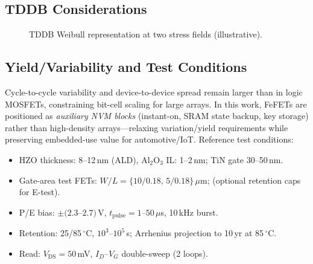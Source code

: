 \documentclass[journal]{IEEEtran}
\begin{document}
\subsection*{TDDB Considerations}
\begin{figure}[t]
\centering
{}
\caption{TDDB Weibull representation at two stress fields (illustrative).}
\label{fig:tddb}
\end{figure}

\subsection*{Yield/Variability and Test Conditions}
Cycle-to-cycle variability and device-to-device spread remain larger than in logic MOSFETs, constraining bit-cell scaling for large arrays. In this work, FeFETs are positioned as \emph{auxiliary NVM blocks} (instant-on, SRAM state backup, key storage) rather than high-density arrays—relaxing variation/yield requirements while preserving embedded-use value for automotive/IoT. Reference test conditions:
\begin{itemize}
  \item HZO thickness: 8–12\,nm (ALD), Al$_2$O$_3$ IL: 1–2\,nm; TiN gate 30–50\,nm.
  \item Gate-area test FETs: $W/L=\{10/0.18,\,5/0.18\}\,\mu$m; (optional retention caps for E-test).
  \item P/E bias: $\pm(2.3$–$2.7)$\,V, $t_\mathrm{pulse}=1$–$50\,\mu$s, 10\,kHz burst.
  \item Retention: 25/85\,$^\circ$C, $10^3$–$10^5$\,s; Arrhenius projection to 10\,yr at 85\,$^\circ$C.
  \item Read: $V_\mathrm{DS}=50$\,mV, $I_D$–$V_G$ double-sweep (2 loops).
\end{itemize}
\end{document}
